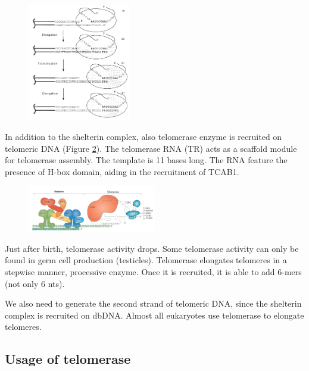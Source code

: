 \begin{figure}
\centering
\includegraphics[width=0.4\textwidth]{../_resources/Screen_Shot_2022-12-15_at_22-58-03.png}
\caption{}
\label{fig:temp}
\end{figure}

In addition to the shelterin complex, also telomerase enzyme is
recruited on telomeric DNA (Figure \ref{fig:recr}). The telomerase RNA (TR) acts as a scaffold
module for telomerase assembly. The template is 11 bases long. The RNA
feature the presence of H-box domain, aiding in the recruitment of
TCAB1.

\begin{figure}
\centering
\includegraphics[width=0.5\textwidth]{../_resources/Screen_Shot_2022-12-15_at_22-58-28.png}
\caption{}
\label{fig:recr}
\end{figure}

Just after birth, telomerase activity drops. Some telomerase activity
can only be found in germ cell production (testicles). Telomerase
elongates telomeres in a stepwise manner, processive enzyme. Once it is
recruited, it is able to add 6-mers (not only 6 nts).

We also need to generate the second strand of telomeric DNA, since the
shelterin complex is recruited on dbDNA. Almost all eukaryotes use
telomerase to elongate telomeres.

\hypertarget{usage-of-telomerase}{%
\subsection{Usage of telomerase}\label{usage-of-telomerase}}

